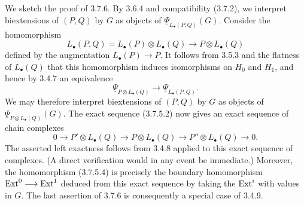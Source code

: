We sketch the proof of 3.7.6.  By 3.6.4 and compatibility (3.7.2),
we interpret biextensions of $(P,Q)$ by $G$ as objects of
$\underline\Psi_{L_\bullet(P,Q)}(G)$.  Consider the homomorphism
\[
 L_\bullet(P,Q)
 =L_\bullet(P)\otimes L_\bullet(Q)
 \longrightarrow P\otimes L_\bullet(Q)
\]
defined by the augmentation $L_\bullet(P)\longrightarrow P$.
It follows from 3.5.3 and the flatness of $L_\bullet(Q)$ that this
homomorphism induces isomorphisms on $H_0$ and $H_1$, and hence by
3.4.7 an equivalence
\[
 \underline\Psi_{P\otimes L_\bullet(Q)}
 \longrightarrow
 \underline\Psi_{L_\bullet(P,Q)}.
\]
We may therefore interpret biextensions of $(P,Q)$ by $G$ as objects
of $\underline\Psi_{P\otimes L_\bullet(Q)}(G)$.  The exact sequence
(3.7.5.2) now gives an exact sequence of chain complexes
\begin{equation}\tag{3.7.6.1}
 0\longrightarrow P'\otimes L_\bullet(Q)
 \longrightarrow P\otimes L_\bullet(Q)
 \longrightarrow P''\otimes L_\bullet(Q)
 \longrightarrow0.
\end{equation}
The asserted left exactness follows from 3.4.8 applied to this exact
sequence of complexes.  (A direct verification would in any event
be immediate.)  Moreover, the homomorphism (3.7.5.4) is precisely the
boundary homomorphism $\operatorname{Ext}^0\longrightarrow\operatorname{Ext}^1$ deduced from this
exact sequence by taking the $\operatorname{Ext}^i$ with values in $G$.  The last
assertion of 3.7.6 is consequently a special case of 3.4.9.
